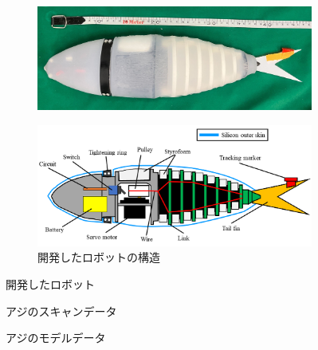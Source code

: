 \begin{figure}[htbp]
    \centering  
    \begin{subfigure}[b]{0.9\linewidth}
        \centering
        \includegraphics[width=0.9\linewidth]{chapters/picture/withskin.jpg}
        \label{fig:fishrobo_with}
    \end{subfigure}
    \begin{subfigure}[b]{0.9\linewidth}
        \centering
        \includegraphics[width=0.9\linewidth]{chapters/picture/fish.png}
        \caption{開発したロボットの構造}
        \label{fig:kouzou}
    \end{subfigure}
    \caption{開発したロボット}
    \label{fig:gaikan}
\end{figure}
\begin{figure}[b]
    \centering
    \begin{minipage}[b]{0.4\linewidth}
        \centering
        \caption{アジのスキャンデータ}
        \label{fig:data_scan}
    \end{minipage}
    \hspace{0.05\linewidth}
    \begin{minipage}[b]{0.4\linewidth}
        \centering
        \caption{アジのモデルデータ}
        \label{fig:data_model}
    \end{minipage}
\end{figure}

